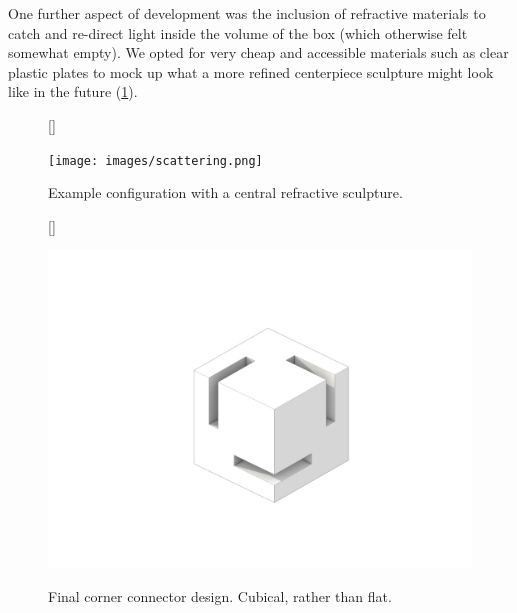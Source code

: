 \documentclass[12pt]{article}
\begin{document}
    One further aspect of development was the inclusion of refractive materials to catch and re-direct light inside the volume of the box (which otherwise felt somewhat empty). We opted for very cheap and accessible materials such as clear plastic plates to mock up what a more refined centerpiece sculpture might look like in the future (\cref{fig:scattering}).

    \begin{figure}[h]
        [\FBwidth]
        {\caption{Example configuration with a central refractive sculpture.}\label{fig:scattering}}
        {\texttt{[image: images/scattering.png]}}
    \end{figure}

    \begin{figure}[h]
        [\FBwidth]
        {\caption{Final corner connector design. Cubical, rather than flat.}\label{fig:corner}}
        {\includegraphics[width=\linewidth]{images/corner.png}}
    \end{figure}
\end{document}
